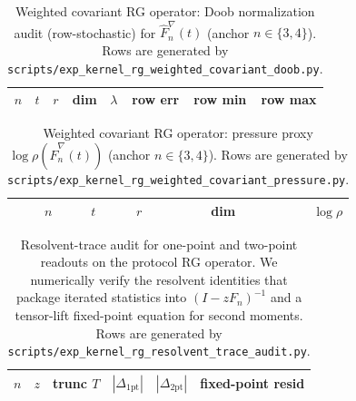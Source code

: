 \begin{table}[H]
\centering
\scriptsize
\setlength{\tabcolsep}{6pt}
\renewcommand{\arraystretch}{1.15}
\begin{tabular}{rrrrrrrr}
\toprule
$n$ & $t$ & $r$ & dim & $\lambda$ & row err & row min & row max \\
\midrule
%
\end{tabular}
\caption{Weighted covariant RG operator: Doob normalization audit (row-stochastic) for $\widehat F_n^\nabla(t)$ (anchor $n\in\{3,4\}$).
Rows are generated by \texttt{scripts/exp\_kernel\_rg\_weighted\_covariant\_doob.py}.}
\label{tab:kernel_rg_weighted_covariant_doob}
\end{table}

\begin{table}[H]
\centering
\scriptsize
\setlength{\tabcolsep}{6pt}
\renewcommand{\arraystretch}{1.15}
\begin{tabular}{rrrrr}
\toprule
$n$ & $t$ & $r$ & dim & $\log\rho$ \\
\midrule
%
\end{tabular}
\caption{Weighted covariant RG operator: pressure proxy $\log\rho(\widehat F_n^\nabla(t))$ (anchor $n\in\{3,4\}$).
Rows are generated by \texttt{scripts/exp\_kernel\_rg\_weighted\_covariant\_pressure.py}.}
\label{tab:kernel_rg_weighted_covariant_pressure}
\end{table}

\begin{table}[H]
\centering
\scriptsize
\setlength{\tabcolsep}{6pt}
\renewcommand{\arraystretch}{1.15}
\begin{tabular}{rrrrrr}
\toprule
$n$ & $z$ & trunc $T$ & $|\Delta_{1\mathrm{pt}}|$ & $|\Delta_{2\mathrm{pt}}|$ & fixed-point resid \\
\midrule
%
\end{tabular}
\caption{Resolvent-trace audit for one-point and two-point readouts on the protocol RG operator.
We numerically verify the resolvent identities that package iterated statistics into $(I-zF_n)^{-1}$ and a tensor-lift fixed-point equation for second moments.
Rows are generated by \texttt{scripts/exp\_kernel\_rg\_resolvent\_trace\_audit.py}.}
\label{tab:kernel_rg_resolvent_trace_audit}
\end{table}

